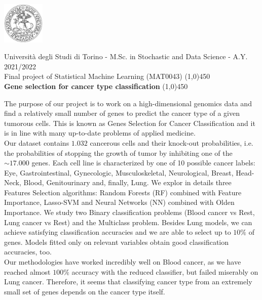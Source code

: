 \documentclass[a4paper,11pt, oneside]{article}  %
\begin{document}
\setcounter{secnumdepth}{2}
\pagestyle{plain} %

\centerline {\includegraphics[width=2cm]{logo.jpg}}
\begin{center}
	Università degli Studi di Torino - M.Sc.  in Stochastic and Data Science - A.Y.  2021/2022 \\
	\Large { Final project of Statistical Machine Learning (MAT0043)}
	\line(1,0){450}\\ 
	\vspace{0.4cm} 
	{ \huge \textbf{Gene selection for cancer type classification} }
	\vspace{0.1cm}
	\line(1,0){450} \\
\end{center}


The purpose of our project is to work on a high-dimensional genomics data and find a relatively small number of genes to predict the cancer type of a given tumorous cells. This is known as Genes Selection for Cancer Classification and it is in line with many up-to-date problems of applied medicine. \\
Our dataset contains $1.032$ cancerous cells and their knock-out probabilities, i.e. the probabilities of stopping the growth of tumor by inhibiting one of the $\sim 17.000$ genes. Each cell line is characterized by one of 10 possible cancer labels: Eye, Gastrointestinal, Gynecologic, Musculoskeletal, Neurological, Breast, Head-Neck, Blood, Genitourinary and, finally, Lung. We explor in details three Features Selection algorithms: Random Forests (RF) combined with Feature Importance, Lasso-SVM and Neural Networks (NN) combined with Olden Importance.  We study two Binary classification problems (Blood cancer vs Rest, Lung cancer vs Rest) and the Multiclass problem. Besides Lung models, we can achieve satisfying classification accuracies and we are able to select up to $10\%$ of genes. Models fitted only on relevant variables obtain good classification accuracies, too.\\
Our methodologies have worked incredibly well on Blood cancer, as we have reached almost $100\%$ accuracy with the reduced classifier, but failed miserably on Lung cancer. Therefore, it seems that classifying cancer type from an extremely small set of genes depends on the cancer type itself.  
\end{document}
